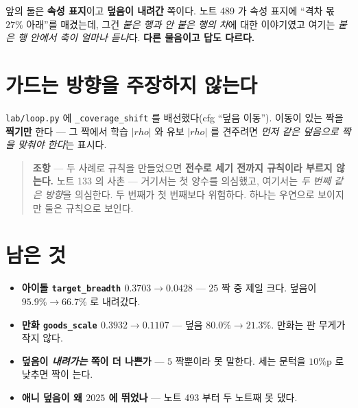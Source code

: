 \documentclass[11pt]{article}
\begin{document}
앞의 둘은 \textbf{속성 표지}이고 \textbf{덮음이 내려간} 쪽이다. 노트 489
가 속성 표지에 ``격차 몫 $27\%$ 아래''를 매겼는데, 그건 \emph{붙은 행과
안 붙은 행의 차}에 대한 이야기였고 여기는 \emph{붙은 행 안에서 축이 얼마나
듣나}다. \textbf{다른 물음이고 답도 다르다.}

\section{가드는 방향을 주장하지 않는다}

\texttt{lab/loop.py} 에 \texttt{\_coverage\_shift} 를 배선했다(cfg
``덮음 이동''). 이동이 있는 짝을 \textbf{찍기만} 한다 --- 그 짝에서 학습
$|rho|$ 와 유보 $|rho|$ 를 견주려면 \emph{먼저 같은 덮음으로 짝을 맞춰야
한다}는 표시다.

\begin{quote}
\textbf{조항} --- 두 사례로 규칙을 만들었으면 \textbf{전수로 세기 전까지
규칙이라 부르지 않는다.} 노트 133 의 사촌 --- 거기서는 첫 양수를
의심했고, 여기서는 \emph{두 번째 같은 방향}을 의심한다. 두 번째가 첫
번째보다 위험하다. 하나는 우연으로 보이지만 둘은 규칙으로 보인다.
\end{quote}

\section*{남은 것}

\begin{itemize}
\item \textbf{아이돌 \texttt{target\_breadth} $0.3703 \to 0.0428$} ---
$25$ 짝 중 제일 크다. 덮음이 $95.9\% \to 66.7\%$ 로 내려갔다.
\item \textbf{만화 \texttt{goods\_scale} $0.3932 \to 0.1107$} --- 덮음
$80.0\% \to 21.3\%$. 만화는 판 무게가 작지 않다.
\item \textbf{덮음이 \emph{내려가는} 쪽이 더 나쁜가} --- $5$ 짝뿐이라
못 말한다. 세는 문턱을 $10\%$p 로 낮추면 짝이 는다.
\item \textbf{애니 덮음이 왜 $2025$ 에 뛰었나} --- 노트 493 부터 두
노트째 못 댔다.
\end{itemize}
\end{document}
